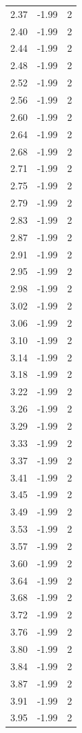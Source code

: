 \begin{longtable}{lrr}
  2.37 & -1.99 & 2 \\
  2.40 & -1.99 & 2 \\
  2.44 & -1.99 & 2 \\
  2.48 & -1.99 & 2 \\
  2.52 & -1.99 & 2 \\
  2.56 & -1.99 & 2 \\
  2.60 & -1.99 & 2 \\
  2.64 & -1.99 & 2 \\
  2.68 & -1.99 & 2 \\
  2.71 & -1.99 & 2 \\
  2.75 & -1.99 & 2 \\
  2.79 & -1.99 & 2 \\
  2.83 & -1.99 & 2 \\
  2.87 & -1.99 & 2 \\
  2.91 & -1.99 & 2 \\
  2.95 & -1.99 & 2 \\
  2.98 & -1.99 & 2 \\
  3.02 & -1.99 & 2 \\
  3.06 & -1.99 & 2 \\
  3.10 & -1.99 & 2 \\
  3.14 & -1.99 & 2 \\
  3.18 & -1.99 & 2 \\
  3.22 & -1.99 & 2 \\
  3.26 & -1.99 & 2 \\
  3.29 & -1.99 & 2 \\
  3.33 & -1.99 & 2 \\
  3.37 & -1.99 & 2 \\
  3.41 & -1.99 & 2 \\
  3.45 & -1.99 & 2 \\
  3.49 & -1.99 & 2 \\
  3.53 & -1.99 & 2 \\
  3.57 & -1.99 & 2 \\
  3.60 & -1.99 & 2 \\
  3.64 & -1.99 & 2 \\
  3.68 & -1.99 & 2 \\
  3.72 & -1.99 & 2 \\
  3.76 & -1.99 & 2 \\
  3.80 & -1.99 & 2 \\
  3.84 & -1.99 & 2 \\
  3.87 & -1.99 & 2 \\
  3.91 & -1.99 & 2 \\
  3.95 & -1.99 & 2 \\

\end{longtable}
